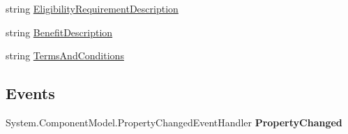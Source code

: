 \begin{DoxyCompactItemize}
\begin{DoxyCompactList}\small\item\em \end{DoxyCompactList}\item 
\hypertarget{class_price___comparison_1_1amazon_1_1ecs_1_1_promotion_summary_a3c39ebe01ceec186d8bd189f24773a79}{string \hyperlink{class_price___comparison_1_1amazon_1_1ecs_1_1_promotion_summary_a3c39ebe01ceec186d8bd189f24773a79}{Eligibility\-Requirement\-Description}}\label{class_price___comparison_1_1amazon_1_1ecs_1_1_promotion_summary_a3c39ebe01ceec186d8bd189f24773a79}

\begin{DoxyCompactList}\small\item\em \end{DoxyCompactList}\item 
\hypertarget{class_price___comparison_1_1amazon_1_1ecs_1_1_promotion_summary_a73b5d82999e9b58980e0ffc9ab9ba16c}{string \hyperlink{class_price___comparison_1_1amazon_1_1ecs_1_1_promotion_summary_a73b5d82999e9b58980e0ffc9ab9ba16c}{Benefit\-Description}}\label{class_price___comparison_1_1amazon_1_1ecs_1_1_promotion_summary_a73b5d82999e9b58980e0ffc9ab9ba16c}

\begin{DoxyCompactList}\small\item\em \end{DoxyCompactList}\item 
\hypertarget{class_price___comparison_1_1amazon_1_1ecs_1_1_promotion_summary_a0deaca73279336b7e92156ae709f6e08}{string \hyperlink{class_price___comparison_1_1amazon_1_1ecs_1_1_promotion_summary_a0deaca73279336b7e92156ae709f6e08}{Terms\-And\-Conditions}}\label{class_price___comparison_1_1amazon_1_1ecs_1_1_promotion_summary_a0deaca73279336b7e92156ae709f6e08}

\begin{DoxyCompactList}\small\item\em \end{DoxyCompactList}\end{DoxyCompactItemize}
\subsection*{Events}
\begin{DoxyCompactItemize}
\item 
\hypertarget{class_price___comparison_1_1amazon_1_1ecs_1_1_promotion_summary_ae9d36470dbd8a6874d2a419d907881d8}{System.\-Component\-Model.\-Property\-Changed\-Event\-Handler {\bfseries Property\-Changed}}\label{class_price___comparison_1_1amazon_1_1ecs_1_1_promotion_summary_ae9d36470dbd8a6874d2a419d907881d8}

\end{DoxyCompactItemize}
